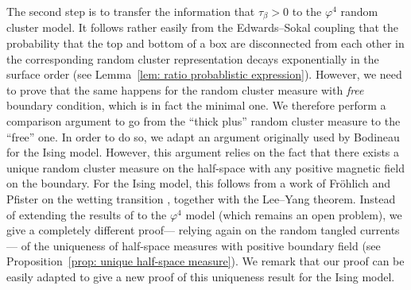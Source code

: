 \documentclass[11pt,a4paper]{article}
\theoremstyle{definition}
\numberwithin{equation}{section}
\begin{document}
The second step is to transfer the information that $\tau_\beta>0$ to the $\varphi^4$ random cluster model. It follows rather easily from the Edwards--Sokal coupling that the probability that the top and bottom of a box are disconnected from each other in the corresponding random cluster representation decays exponentially in the surface order (see Lemma~\ref{lem: ratio probablistic expression}). However, we need to prove that the same happens for the random cluster measure with \emph{free} boundary condition, which is in fact the minimal one. We therefore perform a comparison argument to go from the ``thick plus'' random cluster measure to the ``free'' one. In order to do so, we adapt an argument originally used by Bodineau \cite{Bod05} for the Ising model. However, this argument relies on the fact that there exists a unique random cluster measure on the half-space with any positive magnetic field on the boundary. For the Ising model, this follows from a work of Fröhlich and Pfister on the wetting transition \cite{FP87}, together with the Lee--Yang theorem. Instead of extending the results of \cite{FP87} to the $\varphi^4$ model (which remains an open problem), we give a completely different proof--- relying again on the random tangled currents--- of the uniqueness of half-space measures with positive boundary field (see Proposition~\ref{prop: unique half-space measure}). We remark that our proof can be easily adapted to give a new proof of this uniqueness result for the Ising model. 
\end{document}
